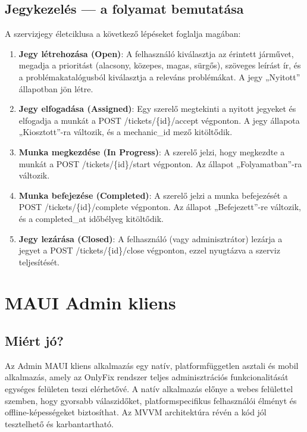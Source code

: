\documentclass[colorlinks]{thesis-kando}
\begin{document}
\section{Jegykezelés --- a folyamat bemutatása}

A szervizjegy életciklusa a következő lépéseket foglalja magában:

\begin{enumerate}
\item \textbf{Jegy létrehozása (Open)}: A felhasználó kiválasztja az érintett járművet, megadja a prioritást (alacsony, közepes, magas, sürgős), szöveges leírást ír, és a problémakatalógusból kiválasztja a releváns problémákat. A jegy „Nyitott'' állapotban jön létre.
\item \textbf{Jegy elfogadása (Assigned)}: Egy szerelő megtekinti a nyitott jegyeket és elfogadja a munkát a POST /tickets/\{id\}/accept végponton. A jegy állapota „Kiosztott''-ra változik, és a mechanic\_id mező kitöltődik.
\item \textbf{Munka megkezdése (In Progress)}: A szerelő jelzi, hogy megkezdte a munkát a POST /tickets/\{id\}/start végponton. Az állapot „Folyamatban''-ra változik.
\item \textbf{Munka befejezése (Completed)}: A szerelő jelzi a munka befejezését a POST /tickets/\{id\}/complete végponton. Az állapot „Befejezett''-re változik, és a completed\_at időbélyeg kitöltődik.
\item \textbf{Jegy lezárása (Closed)}: A felhasználó (vagy adminisztrátor) lezárja a jegyet a POST /tickets/\{id\}/close végponton, ezzel nyugtázva a szerviz teljesítését.
\end{enumerate}

\chapter{MAUI Admin kliens}

\section{Miért jó?}

Az Admin MAUI kliens alkalmazás egy natív, platformfüggetlen asztali és mobil alkalmazás, amely az OnlyFix rendszer teljes adminisztrációs funkcionalitását egységes felületen teszi elérhetővé. A natív alkalmazás előnye a webes felülettel szemben, hogy gyorsabb válaszidőket, platformspecifikus felhasználói élményt és offline-képességeket biztosíthat. Az MVVM architektúra révén a kód jól tesztelhető és karbantartható.
\end{document}
